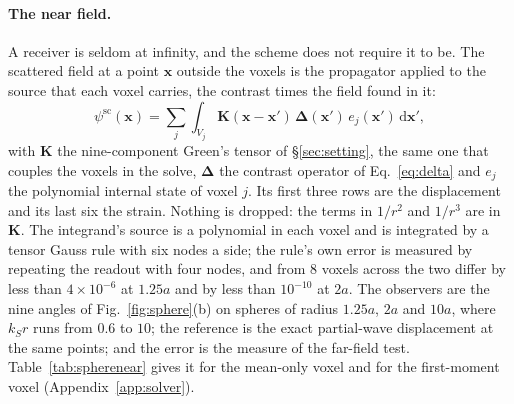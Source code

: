 \documentclass[11pt,a4paper]{article}
\newcommand{\bK}{\mathbf{K}}
\newcommand{\bD}{\boldsymbol{\Delta}}
\newcommand{\dd}{\mathrm{d}}
\begin{document}
\paragraph{The near field.} A receiver is seldom at infinity, and the scheme does not require it to
be. The scattered field at a point $\mathbf{x}$ outside the voxels is the propagator applied to the
source that each voxel carries, the contrast times the field found in it:
\begin{equation}\label{eq:nearfield}
  \psi^{\text{sc}}(\mathbf{x})=\sum_{j}\int_{V_j}
     \bK(\mathbf{x}-\mathbf{x}')\,\bD(\mathbf{x}')\,e_j(\mathbf{x}')\,\dd\mathbf{x}',
\end{equation}
with $\bK$ the nine-component Green's tensor of \S\ref{sec:setting}, the same one that couples the
voxels in the solve, $\bD$ the contrast operator of Eq.~\eqref{eq:delta} and $e_j$ the polynomial
internal state of voxel $j$. Its first three rows are the displacement and its last six the strain.
Nothing is dropped: the terms in $1/r^2$ and $1/r^3$ are in $\bK$. The integrand's source is a polynomial in each voxel and is integrated
by a tensor Gauss rule with six nodes a side; the rule's own error is measured by repeating the readout
with four nodes, and from $8$ voxels across the two differ by less than $4\times10^{-6}$ at $1.25a$ and
by less than $10^{-10}$ at $2a$. The observers are the nine angles of Fig.~\ref{fig:sphere}(b) on
spheres of radius $1.25a$, $2a$ and $10a$, where $k_Sr$ runs from $0.6$ to $10$; the reference is the
exact partial-wave displacement at the same points; and the error is the measure of the far-field
test. Table~\ref{tab:spherenear} gives it for the mean-only voxel and for the first-moment voxel
(Appendix~\ref{app:solver}).
\end{document}

